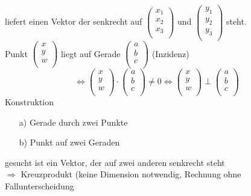 \documentclass[11pt]{article}
\begin{document}
liefert einen Vektor der senkrecht auf 
$ \begin{pmatrix}
x_1 \\ x_2 \\ x_3 \\
\end{pmatrix}
$ und $
\begin{pmatrix}
y_1 \\ y_2 \\ y_3 \\
\end{pmatrix}$ steht.\\
Punkt $\begin{pmatrix}
x \\ y\\ w \\
\end{pmatrix}$ liegt auf Gerade 
$\begin{pmatrix}
a \\ b\\ c \\
\end{pmatrix}$ (Inzidenz)
$$ \Leftrightarrow 
\begin{pmatrix}
x \\ y\\ w \\
\end{pmatrix}
\cdot
\begin{pmatrix}
a \\ b\\ c \\
\end{pmatrix} \neq 0 \Leftrightarrow 
\begin{pmatrix}
x \\ y\\ w \\
\end{pmatrix}
\perp
\begin{pmatrix}
a \\ b\\ c \\
\end{pmatrix}
$$
Konstruktion
\begin{enumerate}
\item[a)] Gerade durch zwei Punkte
\item[b)] Punkt auf zwei Geraden
\end{enumerate}
gesucht ist ein Vektor, der auf zwei anderen senkrecht steht\\
$\Rightarrow $ Kreuzprodukt (keine Dimension notwendig, Rechnung ohne Fallunterscheidung\\
\end{document}
